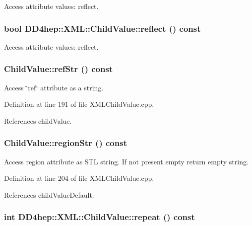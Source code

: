 Access attribute values: reflect. \hypertarget{struct_d_d4hep_1_1_x_m_l_1_1_child_value_aa4a712bb68faffbd0ff7d4b6cae79d57}{
\subsubsection[{reflect}]{\setlength{\rightskip}{0pt plus 5cm}bool DD4hep::XML::ChildValue::reflect () const}}
\label{struct_d_d4hep_1_1_x_m_l_1_1_child_value_aa4a712bb68faffbd0ff7d4b6cae79d57}


Access attribute values: reflect. \hypertarget{struct_d_d4hep_1_1_x_m_l_1_1_child_value_a8b2db1484aa244a2b516e0513e265462}{
\subsubsection[{refStr}]{ ChildValue::refStr () const}}
\label{struct_d_d4hep_1_1_x_m_l_1_1_child_value_a8b2db1484aa244a2b516e0513e265462}


Access \char`\"{}ref\char`\"{} attribute as a string. 

Definition at line 191 of file XMLChildValue.cpp.

References childValue.\hypertarget{struct_d_d4hep_1_1_x_m_l_1_1_child_value_a3ede8fa402040bee29b63eebff108349}{
\subsubsection[{regionStr}]{ ChildValue::regionStr () const}}
\label{struct_d_d4hep_1_1_x_m_l_1_1_child_value_a3ede8fa402040bee29b63eebff108349}


Access region attribute as STL string. If not present empty return empty string. 

Definition at line 204 of file XMLChildValue.cpp.

References childValueDefault.\hypertarget{struct_d_d4hep_1_1_x_m_l_1_1_child_value_ac04ff102c89a9deed658e67d24273ea5}{
\subsubsection[{repeat}]{\setlength{\rightskip}{0pt plus 5cm}int DD4hep::XML::ChildValue::repeat () const}}
\label{struct_d_d4hep_1_1_x_m_l_1_1_child_value_ac04ff102c89a9deed658e67d24273ea5}


